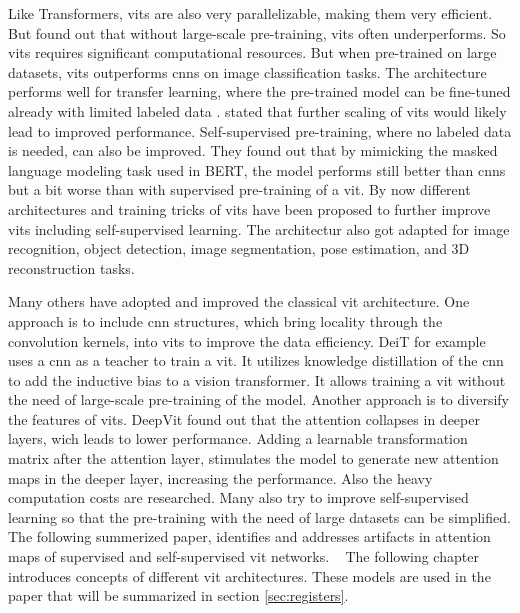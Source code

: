 \documentclass[conference]{IEEEtran}
\begin{document}
  Like Transformers, \acp{vit} are also very parallelizable, making them very efficient. But \cite{visiontransformers2021} found out that without large-scale pre-training, \acp{vit} often underperforms. So \acp{vit} requires significant computational resources. But when pre-trained on large datasets, \acp{vit} outperforms \acp{cnn} on image classification tasks. The architecture performs well for transfer learning, where the pre-trained model can be fine-tuned already with limited labeled data \cite{visiontransformers2021}.  \cite{visiontransformers2021} stated that further scaling of \acp{vit} would likely lead to improved performance. Self-supervised pre-training, where no labeled data is needed, can also be improved. They found out that by mimicking the masked language modeling task used in BERT, the model performs still better than \acp{cnn} but a bit worse than with supervised pre-training of a \ac{vit}. By now different architectures and training tricks of \acp{vit} have been proposed to further improve \acp{vit} including self-supervised learning. The architectur also got adapted for image recognition, object detection, image segmentation, pose estimation, and 3D reconstruction tasks. \cite{vit-state-challenges}

  Many others have adopted and improved the classical \ac{vit} architecture. One approach is to include \ac{cnn} structures, which bring locality through the convolution kernels, into \acp{vit} to improve the data efficiency. DeiT \cite{deit} for example uses a \ac{cnn} as a teacher to train a \ac{vit}. It utilizes knowledge distillation of the \ac{cnn} to add the inductive bias to a vision transformer. It allows training a \ac{vit} without the need of large-scale pre-training of the model. \cite{vit-state-challenges} Another approach is to diversify the features of \acp{vit}. DeepVit \cite{deepvit} found out that the attention collapses in deeper layers, wich leads to lower performance. Adding a learnable transformation matrix after the attention layer, stimulates the model to generate new attention maps in the deeper layer, increasing the performance. \cite{vit-state-challenges} Also the heavy computation costs are researched. Many also try to improve self-supervised learning so that the pre-training with the need of large datasets can be simplified. \cite{vit-state-challenges} The following summerized paper, identifies and addresses artifacts in attention maps of supervised and self-supervised \ac{vit} networks.
  
  The following chapter introduces concepts of different \ac{vit} architectures. These models are used in the paper \cite{registers} that will be summarized in section \ref{sec:registers}.
\end{document}
